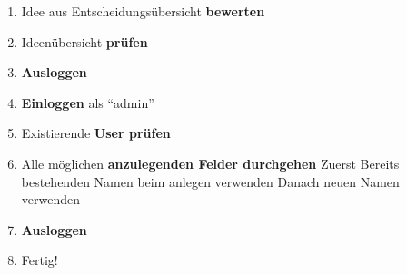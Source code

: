 \begin{enumerate}
\item Idee aus Entscheidungsübersicht \textbf{bewerten}
\item Ideenübersicht \textbf{prüfen}
\item \textbf{Ausloggen}
\item \textbf{Einloggen} als \enquote{admin}
\item Existierende \textbf{User prüfen}
\item Alle möglichen \textbf{anzulegenden Felder durchgehen}
 \subitem Zuerst Bereits bestehenden Namen beim anlegen verwenden
 \subitem Danach neuen Namen verwenden
\item \textbf{Ausloggen}
\item Fertig!
\end{enumerate}
